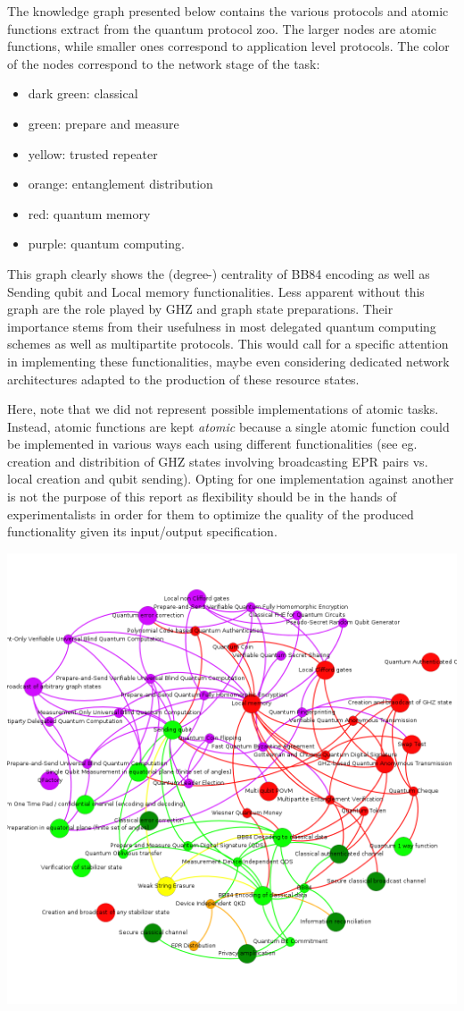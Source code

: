 \documentclass[11pt]{article}
\begin{document}
The knowledge graph presented below contains the various protocols and atomic functions extract from the quantum protocol zoo. The larger nodes are atomic functions, while smaller ones correspond to application level protocols. The color of the nodes correspond to the network stage of the task: 
\begin{itemize}
\item dark green: classical
\item green: prepare and measure
\item yellow: trusted repeater
\item orange: entanglement distribution
\item red: quantum memory
\item purple: quantum computing.
\end{itemize}

This graph clearly shows the (degree-) centrality of BB84 encoding as well as Sending qubit and Local memory functionalities. Less apparent without this graph are the role played by GHZ and graph state preparations. Their importance stems from their usefulness in most delegated quantum computing schemes as well as multipartite protocols. This would call for a specific attention in implementing these functionalities, maybe even considering  dedicated network architectures adapted to the production of these resource states.

Here, note that  we did not represent possible implementations of atomic tasks. Instead, atomic functions are kept \emph{atomic} because a single atomic function could be implemented in various ways each using different functionalities (see eg. creation and distribition of GHZ states involving broadcasting EPR pairs vs. local creation and qubit sending). Opting for one implementation against another is not the purpose of this report as flexibility should be in the hands of experimentalists in order for them to optimize the quality of the produced functionality given its input/output specification.

\begin{center}
\includegraphics[width=.9\linewidth]{./atomic.kg.png}
\end{center}
\end{document}
